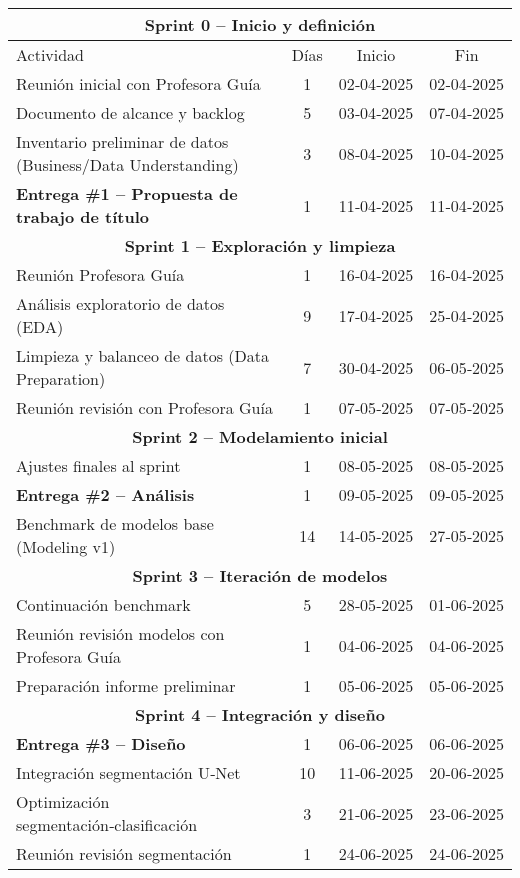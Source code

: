 
\begin{table}[H]
\centering
\begin{tabularx}{\textwidth}{|X|c|c|c|}
\hline
\multicolumn{4}{|c|}{\textbf{Sprint 0 – Inicio y definición}} \\\hline
Actividad & Días & Inicio & Fin \\\hline
Reunión inicial con Profesora Guía & 1 & 02‑04‑2025 & 02‑04‑2025 \\
Documento de alcance y backlog & 5 & 03‑04‑2025 & 07‑04‑2025 \\
Inventario preliminar de datos (Business/Data Understanding) & 3 & 08‑04‑2025 & 10‑04‑2025 \\
\textbf{Entrega \#1 – Propuesta de trabajo de título} & 1 & 11‑04‑2025 & 11‑04‑2025 \\\hline

\multicolumn{4}{|c|}{\textbf{Sprint 1 – Exploración y limpieza}} \\\hline
Reunión Profesora Guía & 1 & 16‑04‑2025 & 16‑04‑2025 \\
Análisis exploratorio de datos (EDA) & 9 & 17‑04‑2025 & 25‑04‑2025 \\
Limpieza y balanceo de datos (Data Preparation) & 7 & 30‑04‑2025 & 06‑05‑2025 \\
Reunión revisión con Profesora Guía & 1 & 07‑05‑2025 & 07‑05‑2025 \\\hline

\multicolumn{4}{|c|}{\textbf{Sprint 2 – Modelamiento inicial}} \\\hline
Ajustes finales al sprint & 1 & 08‑05‑2025 & 08‑05‑2025 \\
\textbf{Entrega \#2 – Análisis} & 1 & 09‑05‑2025 & 09‑05‑2025 \\
Benchmark de modelos base (Modeling v1) & 14 & 14‑05‑2025 & 27‑05‑2025 \\\hline

\multicolumn{4}{|c|}{\textbf{Sprint 3 – Iteración de modelos}} \\\hline
Continuación benchmark & 5 & 28‑05‑2025 & 01‑06‑2025 \\
Reunión revisión modelos con Profesora Guía & 1 & 04‑06‑2025 & 04‑06‑2025 \\
Preparación informe preliminar & 1 & 05‑06‑2025 & 05‑06‑2025 \\\hline

\multicolumn{4}{|c|}{\textbf{Sprint 4 – Integración y diseño}} \\\hline
\textbf{Entrega \#3 – Diseño} & 1 & 06‑06‑2025 & 06‑06‑2025 \\
Integración segmentación U‑Net & 10 & 11‑06‑2025 & 20‑06‑2025 \\
Optimización segmentación‑clasificación & 3 & 21‑06‑2025 & 23‑06‑2025 \\
Reunión revisión segmentación & 1 & 24‑06‑2025 & 24‑06‑2025 \\\hline


\end{tabularx}
\end{table}
